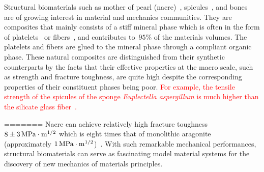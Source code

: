 \documentclass[preprint,12pt,times,draft]{elsarticle}
\numberwithin{equation}{section}
\renewcommand{\>}{$\Rightarrow$}
\begin{document}

Structural biomaterials such as mother of pearl (nacre)~\cite{jackson1988mechanical}, spicules~\cite{monn2015new}, and bones~\cite{wegst2015bioinspired} are of growing interest in material and mechanics communities.
%
They are composites that mainly consists of a stiff mineral phase which is often in the form of platelets~\cite{currey1977mechanical, meyers2008biological, espinosa2011tablet} or fibers~\cite{Aizenberg2005, zhang2011structure, li2015hierarchical}, and contributes to~$95\%$ of the materials volumes.
%
The platelets and fibers are glued to the mineral phase through a compliant organic phase.
%
These natural composites are distinguished from their synthetic counterparts by the facts that their effective properties at the macro scale, such as strength and fracture toughness, are quite high despite the corresponding properties of their constituent phases being poor.
%
\textcolor{red}{For example, the tensile strength of the spicules of the sponge \textit{Euplectella aspergillum} is much higher than the silicate glass fiber~\cite{walter2007mechanisms}.}
%

=======
Nacre can achieve relatively high fracture toughness $8\pm3 \,\rm{MPa}\cdot m^{1/2}$ which is eight times that of monolithic aragonite (approximately $1\,\rm{MPa}\cdot m^{1/2}$)~\cite{lin2005growth}.
%
With such remarkable mechanical performances, structural biomaterials can serve as fascinating model material systems for the discovery of new mechanics of materials principles.
%
\end{document}
